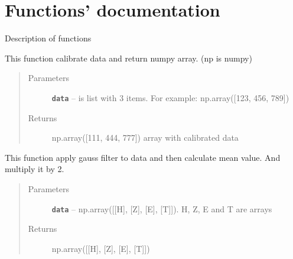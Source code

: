 \documentclass[12pt]{article}
\begin{document}
\section{Functions' documentation}
\par Description of functions
\begin{fulllineitems}
\label{index:calibration.calibrate}
This function calibrate data and return numpy array. (np is numpy)
\begin{quote}\begin{description}
\item[{Parameters}] \leavevmode
\textbf{\texttt{data}} -- is list with 3 items. For example: np.array({[}123, 456, 789{]})

\item[{Returns}] \leavevmode
np.array({[}111, 444, 777{]}) array with calibrated data

\end{description}\end{quote}

\end{fulllineitems}


\begin{fulllineitems}
\label{index:calibration.find_mean}
This function apply gauss filter to data and then calculate mean value. And
multiply it by 2.
\begin{quote}\begin{description}
\item[{Parameters}] \leavevmode
\textbf{\texttt{data}} -- np.array({[}{[}H{]}, {[}Z{]}, {[}E{]}, {[}T{]}{]}). H, Z, E and T are arrays

\item[{Returns}] \leavevmode
np.array({[}{[}H{]}, {[}Z{]}, {[}E{]}, {[}T{]}{]})

\end{description}\end{quote}

\end{fulllineitems}

\end{document}
